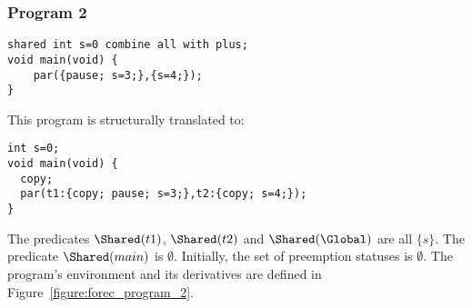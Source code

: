 \subsubsection{Program 2}
\begin{lstlisting}[style=snippet]
shared int s=0 combine all with plus;
void main(void) {
	par({pause; s=3;},{s=4;});
}
\end{lstlisting}
This program is structurally translated to:
\begin{lstlisting}[style=snippet]
int s=0;
void main(void) {
  copy;
  par(t1:{copy; pause; s=3;},t2:{copy; s=4;});
}
\end{lstlisting}
The predicates $\Shared(t1)$, $\Shared(t2)$ and $\Shared(\Global)$ 
are all $\lbrace s \rbrace$.
The predicate $\Shared(main)$ is $\emptyset$.
Initially, the set of preemption statuses \Abort{} is $\emptyset$.
The program's environment \Environment{} and its derivatives 
are defined in Figure~\ref{figure:forec_program_2}.
\newline

